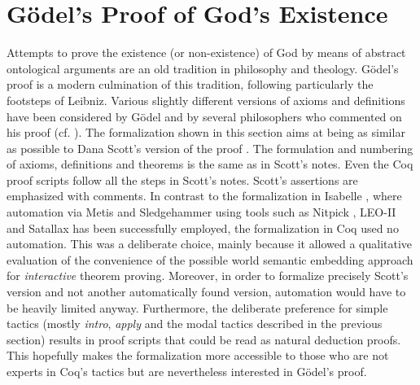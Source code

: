 \documentclass{llncs}
\begin{document}
\section{G\"odel's Proof of God's Existence}
\label{sec:proof}

Attempts to prove the existence (or non-existence) of God by means of
abstract ontological arguments are an old tradition in philosophy and
theology.  
G\"{o}del's proof \cite{Goedel1970,GoedelNotes} is a modern culmination of
this tradition, following particularly the footsteps of Leibniz.
Various slightly different versions of axioms and definitions have
been considered by G\"{o}del and by several philosophers who commented
on his proof
(cf. \cite{sobel2004logic,AndersonGettings,Fitting,Adams,ContemporaryBibliography}). The formalization shown in this section aims at
being as similar as possible to Dana Scott's version of the proof \cite{ScottNotes}. The formulation and numbering of axioms, definitions and theorems is the same as in Scott's notes. Even the Coq proof scripts follow all the steps in Scott's notes. Scott's assertions are emphasized with comments. In contrast to the formalization in Isabelle \cite{ToDo:our isabelle formalization in ArchiveFormalProofs}, where automation via Metis \cite{Hurd03first-orderproof} and Sledgehammer \cite{Sledgehammer} using tools such as Nitpick \cite{Nitpick}, LEO-II \cite{LEO-II} and Satallax \cite{Satallax} has been successfully employed, the formalization in Coq used no automation. This was a deliberate choice, mainly because it allowed a qualitative evaluation of the convenience of the possible world semantic embedding approach for \emph{interactive} theorem proving. Moreover, in order to formalize precisely Scott's version and not another automatically found version, automation would have to be heavily limited anyway. Furthermore, the deliberate preference for simple tactics (mostly \emph{intro}, \emph{apply} and the modal tactics described in the previous section) results in proof scripts that could be read as natural deduction proofs. This hopefully makes the formalization more accessible to those who are not experts in Coq's tactics but are nevertheless interested in G\"odel's proof.
\end{document}
